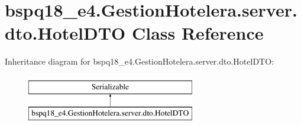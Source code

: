 \hypertarget{classbspq18__e4_1_1_gestion_hotelera_1_1server_1_1dto_1_1_hotel_d_t_o}{}\section{bspq18\+\_\+e4.\+Gestion\+Hotelera.\+server.\+dto.\+Hotel\+D\+TO Class Reference}
\label{classbspq18__e4_1_1_gestion_hotelera_1_1server_1_1dto_1_1_hotel_d_t_o}
Inheritance diagram for bspq18\+\_\+e4.\+Gestion\+Hotelera.\+server.\+dto.\+Hotel\+D\+TO\+:\begin{figure}[H]
\begin{center}
\leavevmode
\includegraphics[height=2.000000cm]{classbspq18__e4_1_1_gestion_hotelera_1_1server_1_1dto_1_1_hotel_d_t_o}
\end{center}
\end{figure}
